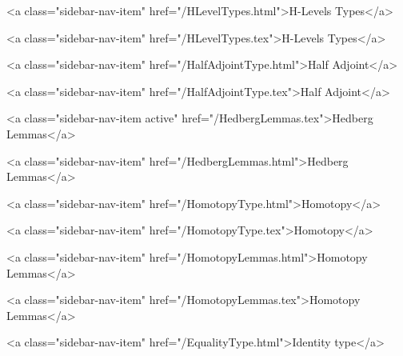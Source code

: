       
        
          <a class="sidebar-nav-item" href="/HLevelTypes.html">H-Levels Types</a>
        
      
    
      
        
          <a class="sidebar-nav-item" href="/HLevelTypes.tex">H-Levels Types</a>
        
      
    
      
        
          <a class="sidebar-nav-item" href="/HalfAdjointType.html">Half Adjoint</a>
        
      
    
      
        
          <a class="sidebar-nav-item" href="/HalfAdjointType.tex">Half Adjoint</a>
        
      
    
      
        
          <a class="sidebar-nav-item active" href="/HedbergLemmas.tex">Hedberg Lemmas</a>
        
      
    
      
        
          <a class="sidebar-nav-item" href="/HedbergLemmas.html">Hedberg Lemmas</a>
        
      
    
      
        
          <a class="sidebar-nav-item" href="/HomotopyType.html">Homotopy</a>
        
      
    
      
        
          <a class="sidebar-nav-item" href="/HomotopyType.tex">Homotopy</a>
        
      
    
      
        
          <a class="sidebar-nav-item" href="/HomotopyLemmas.html">Homotopy Lemmas</a>
        
      
    
      
        
          <a class="sidebar-nav-item" href="/HomotopyLemmas.tex">Homotopy Lemmas</a>
        
      
    
      
        
          <a class="sidebar-nav-item" href="/EqualityType.html">Identity type</a>
        
      
    

